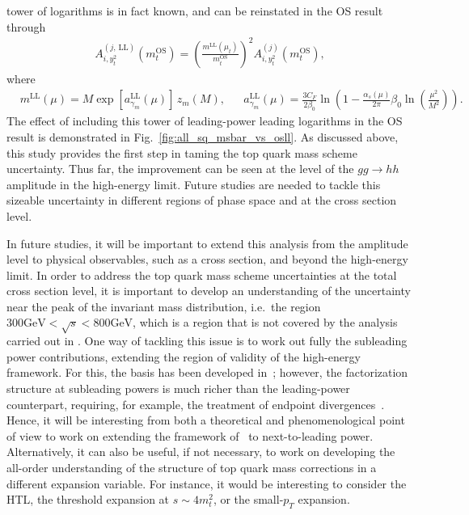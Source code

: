 tower of logarithms is in fact known, and can be reinstated in the OS result
through
\begin{align}
A^{(j,\,{\text{LL}})}_{i,y_t^2}(m_t^\mathrm{OS}) = \left(\frac{m^{\text{LL}}(\mu_t)}{m_t^\mathrm{OS}} \right)^2 A^{(j)}_{i,y_t^2}(m_t^\mathrm{OS}), \label{eq:a_ll}
\end{align}
where
\begin{align}\label{eq:schmeme-conv-all-order}
    &m^{\text{LL}}(\mu) = M \exp \left[ a_{\gamma_m}^{\text{LL}}(\mu)\right]\, z_m(M),&
    &a_{\gamma_m}^{\text{LL}}(\mu) = \frac{3 C_F}{2 \beta_0} \ln \left(1 - \frac{\alpha_s(\mu)}{2 \pi} \beta_0 \ln \left(\frac{\mu^2}{M^2} \right) \right).&
\end{align}
The effect of including this tower of leading-power leading logarithms in the OS
result is demonstrated in Fig.~\ref{fig:all_sq_msbar_vs_osll}. As discussed above,
this study provides the first step in taming the top quark mass scheme uncertainty.
Thus far, the improvement can be seen at the level of the $gg\to hh$ amplitude in the
high-energy limit. Future studies are needed to tackle this sizeable uncertainty
in different regions of phase space and at the cross section level.



In future studies, it will be important to extend this analysis
from the amplitude level to physical observables, such as a
cross section, and beyond the high-energy limit. In order to
address the top quark mass scheme uncertainties at the total
cross section level, it is important to develop an understanding
of the uncertainty near the peak of the invariant mass distribution,
i.e.\ the region $300 \mathrm{GeV} < \sqrt{s} < 800 \mathrm{GeV}$,
which is a region that is not covered by the analysis carried out in
\cite{Jaskiewicz:2024xkd}.
One way of tackling this issue is to work out fully the subleading power
contributions, extending the region of validity of the high-energy framework.
For this, the basis has been developed in~\cite{Jaskiewicz:2024xkd}; however,
the factorization structure at subleading powers is much richer than the leading-power
counterpart, requiring, for example, the treatment of endpoint
divergences~\cite{Beneke:2020ibj,Beneke:2022obx,Liu:2019oav,Bell:2022ott}. Hence, it will be
interesting from both a theoretical and phenomenological point of view
to work on extending the framework of~\cite{Jaskiewicz:2024xkd} to next-to-leading power.
Alternatively, it can also be useful, if not necessary, to work on developing the all-order understanding of the structure of top quark mass corrections in a different expansion variable. For instance, it would be interesting to consider the HTL, the threshold expansion at $s \sim 4 m_t^2$, or the small-$p_T$ expansion.


